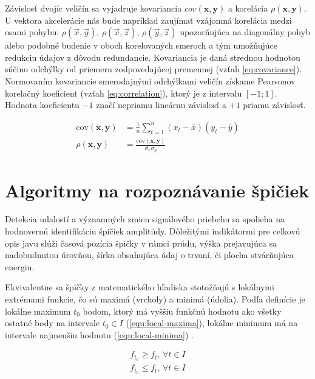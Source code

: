 Závislosť dvojíc veličín sa vyjadruje kovariancia $cov(\mathbf{x}, \mathbf{y})$ a korelácia
$\rho(\mathbf{x}, \mathbf{y})$. U vektora akcelerácie nás bude napríklad zaujímať vzájomná korelácia medzi
osami pohybu: $\rho(\vec{x},\vec{y}),\, \rho(\vec{x},\vec{z}),\, \rho(\vec{y},\vec{z})$ upozorňujúca na diagonálny
pohyb alebo podobné budenie v oboch korelovaných smeroch a tým umožňujúce redukciu údajov z dôvodu redundancie.
Kovariancia je daná strednou hodnotou súčinu odchýlky od priemeru zodpovedajúcej premennej (vzťah \ref{eq:covariance}).
Normovaním kovariancie smerodajnými odchýlkami veličín získame Pearsonov korelačný koeficient
(vzťah \ref{eq:correlation}), ktorý je z intervalu $[-1; 1]$.  Hodnota koeficientu $-1$ značí nepriamu lineárnu závislosť
a $+1$ priamu závislosť.
\begin{ceqn}\begin{align}
\mathrm{cov}(\mathbf{x}, \mathbf{y}) &= \frac{1}{n} \sum_{t=1}^{n}{(x_t - \bar{x})(y_t - \bar{y})} \label{eq:covariance} \\
\rho(\mathbf{x}, \mathbf{y}) &= \frac{\mathrm{cov}(\mathbf{x}, \mathbf{y})}{\sigma_x \sigma_y} \label{eq:correlation}
\end{align}\end{ceqn}

\section{Algoritmy na rozpoznávanie špičiek}
\label{peak-detection}
Detekcia udalostí a významných zmien signálového priebehu sa spolieha na hodnovernú identifikáciu špičiek amplitúdy.
Dôležitými indikátormi pre celkovú opis javu slúži časová pozícia špičky v rámci prúdu, výška prejavujúca
sa nadobudnutou úrovňou, šírka obsahujúca údaj o trvaní, či plocha stvárňujúca energiu.

Ekvivalentne sa špičky z matematického hľadiska stotožňujú s lokálnymi extrémami funkcie, čo sú maximá (vrcholy) a minimá (údolia).
Podľa definície je lokálne maximum $t_0$ bodom, ktorý má vyššiu funkčnú hodnotu ako všetky ostatné body na intervale
$t_0 \in I$ (\ref{equ:local-maxima}), lokálne minimum má na intervale najmenšiu hodnotu (\ref{equ:local-minima})
\cite{survey-peaks-valleys}.
\begin{ceqn}\begin{align}
f_{t_0} \geq f_t,\, \forall t \in I \label{equ:local-maxima}\\
f_{t_0} \leq f_t,\, \forall t \in I \label{equ:local-minima}
\end{align}\end{ceqn}

